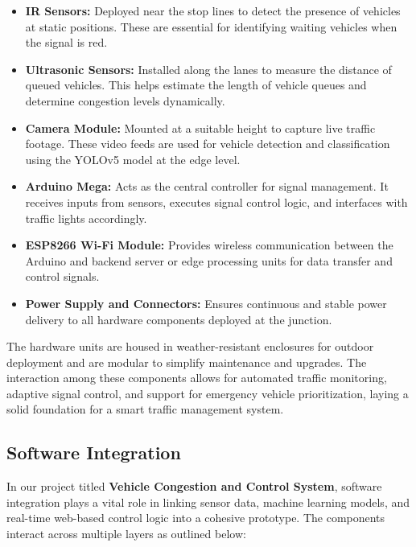 \documentclass[12pt]{report}
\begin{document}
\begin{itemize}
    \item \textbf{IR Sensors:} Deployed near the stop lines to detect the presence of vehicles at static positions. These are essential for identifying waiting vehicles when the signal is red.
    
    \item \textbf{Ultrasonic Sensors:} Installed along the lanes to measure the distance of queued vehicles. This helps estimate the length of vehicle queues and determine congestion levels dynamically.
    
    \item \textbf{Camera Module:} Mounted at a suitable height to capture live traffic footage. These video feeds are used for vehicle detection and classification using the YOLOv5 model at the edge level.
    
    \item \textbf{Arduino Mega:} Acts as the central controller for signal management. It receives inputs from sensors, executes signal control logic, and interfaces with traffic lights accordingly.
    
    \item \textbf{ESP8266 Wi-Fi Module:} Provides wireless communication between the Arduino and backend server or edge processing units for data transfer and control signals.
    
    \item \textbf{Power Supply and Connectors:} Ensures continuous and stable power delivery to all hardware components deployed at the junction.
\end{itemize}

\vspace{0.3cm}

The hardware units are housed in weather-resistant enclosures for outdoor deployment and are modular to simplify maintenance and upgrades. The interaction among these components allows for automated traffic monitoring, adaptive signal control, and support for emergency vehicle prioritization, laying a solid foundation for a smart traffic management system.


\subsection{Software Integration}

In our project titled \textbf{Vehicle Congestion and Control System}, software integration plays a vital role in linking sensor data, machine learning models, and real-time web-based control logic into a cohesive prototype. The components interact across multiple layers as outlined below:
\end{document}
